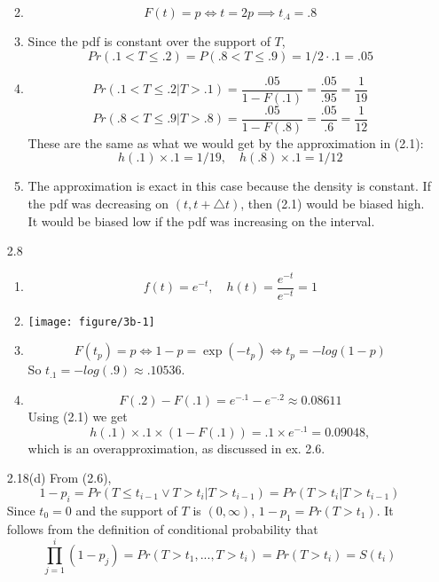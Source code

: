 \documentclass[12pt]{article}\usepackage[]{graphicx}\usepackage[]{color}
\newenvironment{knitrout}{}{} %
\begin{document}
\begin{enumerate}
\begin{enumerate}
\begin{knitrout}
\end{knitrout}
 \item
 \[F(t)=p \iff t=2p \implies t_{.4}=.8\]
 \item
 Since the pdf is constant over the support of $T$,
 \[Pr(.1<T\le.2) = P(.8<T\le.9) = 1/2 \cdot .1 = .05\]
 \item
 \[Pr(.1<T\le.2|T>.1) = \frac{.05}{1-F(.1)}=\frac{.05}{.95} = \frac{1}{19}\]
  \[Pr(.8<T\le.9|T>.8) = \frac{.05}{1-F(.8)}=\frac{.05}{.6} = \frac{1}{12}\]
  These are the same as what we would get by the approximation in (2.1):
  \[h(.1)\times.1 = 1/19,\quad h(.8)\times.1 = 1/12\]
 \item
 The approximation is exact in this case because the density is constant. If the pdf was decreasing on $(t,t+\triangle t)$, then (2.1) would be biased high. It would be biased low if the pdf was increasing on the interval.
\end{enumerate}

\item[2.8]
\begin{enumerate}
  \item
  \[f(t) = e^{-t},\quad h(t) = \frac{e^{-t}}{e^{-t}}=1\]
  \item
\begin{knitrout}
\color{fgcolor}
\texttt{[image: figure/3b-1]} 

\end{knitrout}
  \item
  \[F(t_p) = p \iff 1-p = \exp(-t_p) \iff t_p = -log(1-p)\]
  So $t_{.1} = -log(.9) \approx .10536$.
  \item
  \[F(.2)-F(.1) = e^{-.1}-e^{-.2} \approx 0.08611 \]
  Using (2.1) we get
  \[h(.1)\times .1 \times (1-F(.1)) = .1 \times e^{-.1} = 0.09048,\]
  which is an overapproximation, as discussed in ex. 2.6.
\end{enumerate}

\item[2.18(d)]
From (2.6),
\[1-p_i = Pr(T\le t_{i-1} \lor T > t_i | T>t_{i-1}) = Pr(T>t_i|T>t_{i-1})\]
Since $t_0=0$ and the support of $T$ is $(0,\infty)$, $1 - p_1 = Pr(T>t_1)$. It follows from the definition of conditional probability that
\[\prod_{j=1}^{i}(1-p_j) = Pr(T>t_1,...,T>t_i) = Pr(T>t_i) = S(t_i)\]


\end{enumerate}
\end{document}
